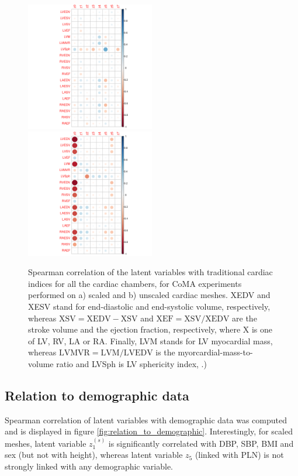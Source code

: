 \begin{figure}[ht!]
\includegraphics[width=0.5\textwidth]{figs/correlation/experiment_1_vs_cardiac_indices}
\includegraphics[width=0.5\textwidth]{figs/correlation/experiment_2_vs_cardiac_indices}
\label{fig:relation_to_indices}
\caption{Spearman correlation of the latent variables with traditional cardiac indices for all the cardiac chambers, for CoMA experiments performed on a) scaled and b) unscaled cardiac meshes. XEDV and XESV stand for end-diastolic and end-systolic volume, respectively, whereas $\text{XSV}=\text{XEDV}-\text{XSV}$ and $\text{XEF}=\text{XSV}/\text{XEDV}$ are the stroke volume and the ejection fraction, respectively, where X is one of LV, RV, LA or RA. Finally, LVM stands for LV myocardial mass, whereas $\text{LVMVR}=\text{LVM}/\text{LVEDV}$ is the myorcardial-mass-to-volume ratio and LVSph is LV sphericity index, .)}
\end{figure}

\subsection*{Relation to demographic data}
Spearman correlation of latent variables with demographic data was computed and is displayed in figure \ref{fig:relation_to_demographic}.
Interestingly, for scaled meshes, latent variable $z_1^{(s)}$ is significantly correlated with DBP, SBP, BMI and sex (but not with height), whereas latent variable $z_5$ (linked with PLN) is not strongly linked with any demographic variable.

